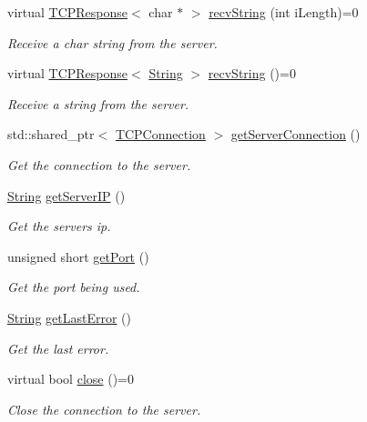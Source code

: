 \begin{DoxyCompactItemize}
virtual \hyperlink{class_rad_j_a_v_1_1_networking_1_1_t_c_p_response}{T\+C\+P\+Response}$<$ char $\ast$ $>$ \hyperlink{class_rad_j_a_v_1_1_networking_1_1_tcpip_client_a595f73382914bb43e70db21bd9f3977a}{recv\+String} (int i\+Length)=0
\begin{DoxyCompactList}\small\item\em Receive a char string from the server. \end{DoxyCompactList}\item 
virtual \hyperlink{class_rad_j_a_v_1_1_networking_1_1_t_c_p_response}{T\+C\+P\+Response}$<$ \hyperlink{class_rad_j_a_v_1_1_string}{String} $>$ \hyperlink{class_rad_j_a_v_1_1_networking_1_1_tcpip_client_ae6ab4734a0461ffe393f6ff2302c0dbe}{recv\+String} ()=0
\begin{DoxyCompactList}\small\item\em Receive a string from the server. \end{DoxyCompactList}\item 
std\+::shared\+\_\+ptr$<$ \hyperlink{class_rad_j_a_v_1_1_networking_1_1_t_c_p_connection}{T\+C\+P\+Connection} $>$ \hyperlink{class_rad_j_a_v_1_1_networking_1_1_tcpip_client_a197d35a074998e466226ea7e43dae060}{get\+Server\+Connection} ()
\begin{DoxyCompactList}\small\item\em Get the connection to the server. \end{DoxyCompactList}\item 
\hyperlink{class_rad_j_a_v_1_1_string}{String} \hyperlink{class_rad_j_a_v_1_1_networking_1_1_tcpip_client_ae03a4a7b2e26c9cf5dbcd788a4694c47}{get\+Server\+IP} ()
\begin{DoxyCompactList}\small\item\em Get the server\textquotesingle{}s ip. \end{DoxyCompactList}\item 
unsigned short \hyperlink{class_rad_j_a_v_1_1_networking_1_1_tcpip_client_a781d9448692dec592e0bf1fa5814a74a}{get\+Port} ()
\begin{DoxyCompactList}\small\item\em Get the port being used. \end{DoxyCompactList}\item 
\hyperlink{class_rad_j_a_v_1_1_string}{String} \hyperlink{class_rad_j_a_v_1_1_networking_1_1_tcpip_client_a06e1ade9aa23df4d251beb2eb96cff4d}{get\+Last\+Error} ()
\begin{DoxyCompactList}\small\item\em Get the last error. \end{DoxyCompactList}\item 
virtual bool \hyperlink{class_rad_j_a_v_1_1_networking_1_1_tcpip_client_a2da2c8b5f71f1d4f16e727d43e26fef8}{close} ()=0
\begin{DoxyCompactList}\small\item\em Close the connection to the server. \end{DoxyCompactList}\end{DoxyCompactItemize}



